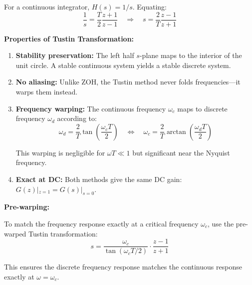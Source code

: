 For a continuous integrator, $H(s) = 1/s$. Equating:
\begin{equation}
\frac{1}{s} = \frac{T}{2}\frac{z+1}{z-1} \quad \Rightarrow \quad s = \frac{2}{T}\frac{z-1}{z+1}
\end{equation}

\textbf{Properties of Tustin Transformation:}

\begin{enumerate}
    \item \textbf{Stability preservation:} The left half $s$-plane maps to the interior of the unit circle. A stable continuous system yields a stable discrete system.

    \item \textbf{No aliasing:} Unlike ZOH, the Tustin method never folds frequencies---it warps them instead.

    \item \textbf{Frequency warping:} The continuous frequency $\omega_c$ maps to discrete frequency $\omega_d$ according to:
    \begin{equation}
    \omega_d = \frac{2}{T}\tan\left(\frac{\omega_c T}{2}\right) \quad \Leftrightarrow \quad \omega_c = \frac{2}{T}\arctan\left(\frac{\omega_d T}{2}\right)
    \end{equation}

    This warping is negligible for $\omega T \ll 1$ but significant near the Nyquist frequency.

    \item \textbf{Exact at DC:} Both methods give the same DC gain: $G(z)|_{z=1} = G(s)|_{s=0}$.
\end{enumerate}


\textbf{Pre-warping:}

To match the frequency response exactly at a critical frequency $\omega_c$, use the pre-warped Tustin transformation:
\begin{equation}
s = \frac{\omega_c}{\tan(\omega_c T/2)} \cdot \frac{z-1}{z+1}
\end{equation}

This ensures the discrete frequency response matches the continuous response exactly at $\omega = \omega_c$.

